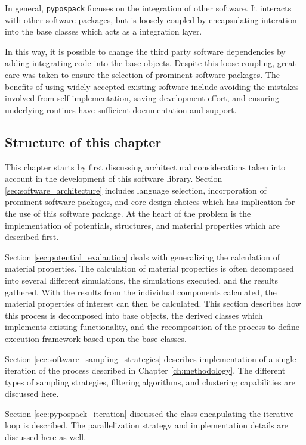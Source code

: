In general, \verb|pypospack| focuses on the integration of other software.  It interacts with other software packages, but is loosely coupled by encapsulating interation into the base classes which acts as a integration layer.

In this way, it is possible to change the third party software dependencies by adding integrating code into the base objects.  Despite this loose coupling, great care was taken to ensure the selection of prominent software packages.  The benefits of using widely-accepted existing software include avoiding the mistakes involved from self-implementation, saving development effort, and ensuring underlying routines have sufficient documentation and support.

\subsection{Structure of this chapter}

This chapter starts by first discussing architectural considerations taken into account in the development of this software library.  Section \ref{sec:software_architecture} includes language selection, incorporation of prominent software packages, and core design choices which has implication for the use of this software package.  At the heart of the problem is the implementation of potentials, structures, and material properties which are described first.

Section \ref{sec:potential_evalaution} deals with generalizing the calculation of material properties.  The calculation of material properties is often decomposed into several different simulations, the simulations executed, and the results gathered.  With the results from the individual components calculated, the material properties of interest can then be calculated.  This section describes how this process is decomposed into base objects, the derived classes which implements existing functionality, and the recomposition of the process to define execution framework based upon the base classes.

Section \ref{sec:software_sampling_strategies} describes implementation of a single iteration of the process described in Chapter \ref{ch:methodology}.  The different types of sampling strategies, filtering algorithms, and clustering capabilities are discussed here.

Section \ref{sec:pypospack_iteration} discussed the class encapulating the iterative loop is described.  The parallelization strategy and implementation details are discussed here as well.


